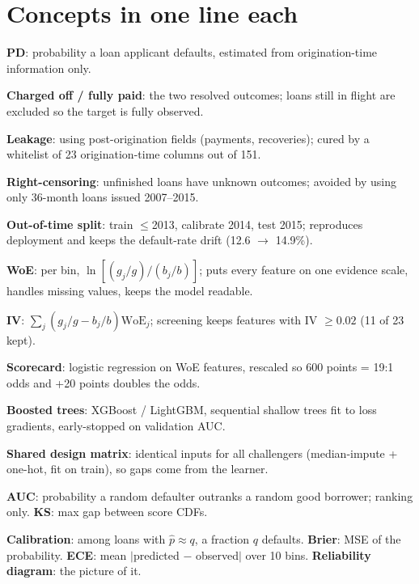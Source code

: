 \documentclass[a4paper,10pt]{article}
\newcommand{\term}[1]{\textbf{#1}:}
\begin{document}

\section*{Concepts in one line each}

\term{PD} probability a loan applicant defaults, estimated from origination-time information only.

\term{Charged off / fully paid} the two resolved outcomes; loans still in flight are excluded so the target is fully observed.

\term{Leakage} using post-origination fields (payments, recoveries); cured by a whitelist of 23 origination-time columns out of 151.

\term{Right-censoring} unfinished loans have unknown outcomes; avoided by using only 36-month loans issued 2007--2015.

\term{Out-of-time split} train $\le$2013, calibrate 2014, test 2015; reproduces deployment and keeps the default-rate drift (12.6 $\to$ 14.9\%).

\term{WoE} per bin, $\ln[(g_j/g)/(b_j/b)]$; puts every feature on one evidence scale, handles missing values, keeps the model readable.

\term{IV} $\sum_j (g_j/g-b_j/b)\mathrm{WoE}_j$; screening keeps features with IV $\ge 0.02$ (11 of 23 kept).

\term{Scorecard} logistic regression on WoE features, rescaled so 600 points = 19:1 odds and +20 points doubles the odds.

\term{Boosted trees} XGBoost / LightGBM, sequential shallow trees fit to loss gradients, early-stopped on validation AUC.

\term{Shared design matrix} identical inputs for all challengers (median-impute + one-hot, fit on train), so gaps come from the learner.

\term{AUC} probability a random defaulter outranks a random good borrower; ranking only. \textbf{KS}: max gap between score CDFs.

\term{Calibration} among loans with $\hat p\approx q$, a fraction $q$ defaults. \textbf{Brier}: MSE of the probability. \textbf{ECE}: mean $|$predicted $-$ observed$|$ over 10 bins. \textbf{Reliability diagram}: the picture of it.
\end{document}
